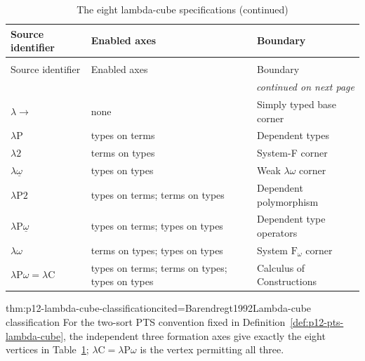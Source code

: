 \begin{longtable}{@{}p{}p{}p{}@{}}
\caption{The eight lambda-cube specifications.}
\label{tab:p12-lambda-cube}\\
\toprule
Source identifier & Enabled axes & Boundary \\ \midrule
\endfirsthead
\caption[]{The eight lambda-cube specifications (continued)}\\
\toprule
Source identifier & Enabled axes & Boundary \\ \midrule
\endhead
\midrule\multicolumn{3}{r}{\emph{continued on next page}}\\
\endfoot
\endlastfoot
\(\lambda{\to}\) & none & Simply typed base corner \\
\(\lambda\mathrm P\) & types on terms & Dependent types \\
\(\lambda 2\) & terms on types & System-F corner \\
\(\lambda\underline{\omega}\) & types on types & Weak \(\lambda\omega\) corner \\
\(\lambda\mathrm P2\) & types on terms; terms on types & Dependent polymorphism \\
\(\lambda\mathrm P\underline{\omega}\) & types on terms; types on types &
Dependent type operators \\
\(\lambda\omega\) & terms on types; types on types & System \(\mathrm F_\omega\) corner \\
\(\lambda\mathrm P\omega=\lambda\mathrm C\) & types on terms; terms on types;
types on types & Calculus of Constructions \\
\bottomrule
\end{longtable}

\begin{hbtheorem}{thm:p12-lambda-cube-classification}{cited=Barendregt1992}{Lambda-cube classification}
For the two-sort PTS convention fixed in
Definition~\ref{def:p12-pts-lambda-cube}, the independent three formation axes
give exactly the eight vertices in Table~\ref{tab:p12-lambda-cube};
\(\lambda\mathrm C=\lambda\mathrm P\omega\) is the vertex permitting all
three.
\end{hbtheorem}

